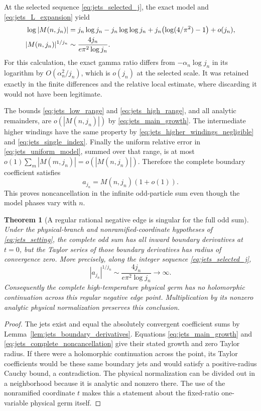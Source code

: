 \documentclass[11pt]{article}
\numberwithin{equation}{section}
\newtheorem{theorem}{Theorem}[section]
\theoremstyle{definition}
\begin{document}
At the selected sequence \eqref{eq:jets_selected_j}, the exact
model and \eqref{eq:jets_L_expansion} yield
\begin{align}
 \log|M(n,j_n)|
 &=j_n\log j_n-j_n\log\log j_n
   +j_n\bigl(\log(4/\pi^2)-1\bigr)+o(j_n),
 \label{eq:jets_main_growth}\\
 |M(n,j_n)|^{1/j_n}
 &\sim\frac{4j_n}{e\pi^2\log j_n}.
 \notag
\end{align}
For this calculation, the exact gamma ratio differs from
$-\alpha_n\log j_n$ in its logarithm by $O(\alpha_n^2/j_n)$,
which is $o(j_n)$ at the selected scale. It was retained exactly
in the finite differences and the relative local estimate, where
discarding it would not have been legitimate.

The bounds \eqref{eq:jets_low_range} and
\eqref{eq:jets_high_range}, and all analytic remainders, are
$o(|M(n,j_n)|)$ by \eqref{eq:jets_main_growth}. The intermediate
higher windings have the same property by
\eqref{eq:jets_higher_windings_negligible} and
\eqref{eq:jets_single_index}. Finally the uniform relative error
in \eqref{eq:jets_uniform_model}, summed over that range, is at
most $o(1)\sum_m|M(m,j_n)|=o(|M(n,j_n)|)$. Therefore the
complete boundary coefficient satisfies
\begin{equation}\label{eq:jets_complete_noncancellation}
 a_{j_n}=M(n,j_n)(1+o(1)).
\end{equation}
This proves noncancellation in the infinite odd-particle sum even
though the model phases vary with $n$.

\begin{theorem}[A regular rational negative edge is singular for the full odd sum]
\label{thm:jets_negative_edge}
Under the physical-branch and nonramified-coordinate hypotheses
of \eqref{eq:jets_setting}, the complete odd sum has all inward
boundary derivatives at $t=0$, but the Taylor series of those
boundary derivatives has radius of convergence zero. More
precisely, along the integer sequence \eqref{eq:jets_selected_j},
\[
 |a_{j_n}|^{1/j_n}\sim\frac{4j_n}{e\pi^2\log j_n}\longrightarrow\infty.
\]
Consequently the complete high-temperature physical germ has no
holomorphic continuation across this regular negative edge
point. Multiplication by its nonzero analytic physical
normalization preserves this conclusion.
\end{theorem}

\begin{proof}
The jets exist and equal the absolutely convergent coefficient
sums by Lemma~\ref{lem:jets_boundary_derivatives}. Equations
\eqref{eq:jets_main_growth} and
\eqref{eq:jets_complete_noncancellation} give their stated
growth and zero Taylor radius. If there were a holomorphic
continuation across the point, its Taylor coefficients would be
these same boundary jets and would satisfy a positive-radius
Cauchy bound, a contradiction. The physical normalization can
be divided out in a neighborhood because it is analytic and
nonzero there. The use of the nonramified coordinate $t$ makes
this a statement about the fixed-ratio one-variable physical
germ itself.
\end{proof}
\end{document}
